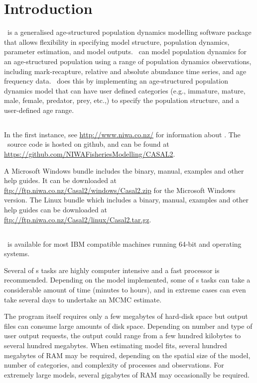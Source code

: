 \section{Introduction\label{sec:Introduction}}

\CNAME\ is a generalised age-structured population dynamics modelling software package that allows flexibility in specifying model structure, population dynamics, parameter estimation, and model outputs. \CNAME\ can model population dynamics for an age-structured population using a range of population dynamics observations, including mark-recapture, relative and absolute abundance time series, and age frequency data. \CNAME\ does this by implementing an age-structured population dynamics model that can have user defined categories (e.g., immature, mature, male, female, predator, prey, etc.,) to specify the population structure, and a user-defined age range. 

\subsection{}

In the first instance, see \url{http://www.niwa.co.nz/} for information about \CNAME . The \CNAME\ source code is hosted on github, and can be found at \url{https://github.com/NIWAFisheriesModelling/CASAL2}.

A Microsoft Windows bundle includes the binary, manual, examples and other help guides. It can be downloaded at \url{ftp://ftp.niwa.co.nz/Casal2/windows/Casal2.zip} for the Microsoft Windows version. The Linux bundle which includes a binary, manual, examples and other help guides can be downloaded at \url{ftp://ftp.niwa.co.nz/Casal2/linux/Casal2.tar.gz}.

\subsection{}

\CNAME\ is available for most IBM compatible machines running 64-bit  and  operating systems.

Several of \CNAME s tasks are highly computer intensive and a fast processor is recommended. Depending on the model implemented, some of \CNAME s tasks can take a considerable amount of time (minutes to hours), and in extreme cases can even take several days to undertake an MCMC estimate. 

The program itself requires only a few megabytes of hard-disk space but output files can consume large amounts of disk space. Depending on number and type of user output requests, the output could range from a few hundred kilobytes to several hundred megabytes. When estimating model fits, several hundred megabytes of RAM may be required, depending on the spatial size of the model, number of categories, and complexity of processes and observations. For extremely large models, several gigabytes of RAM may occasionally be required. 

